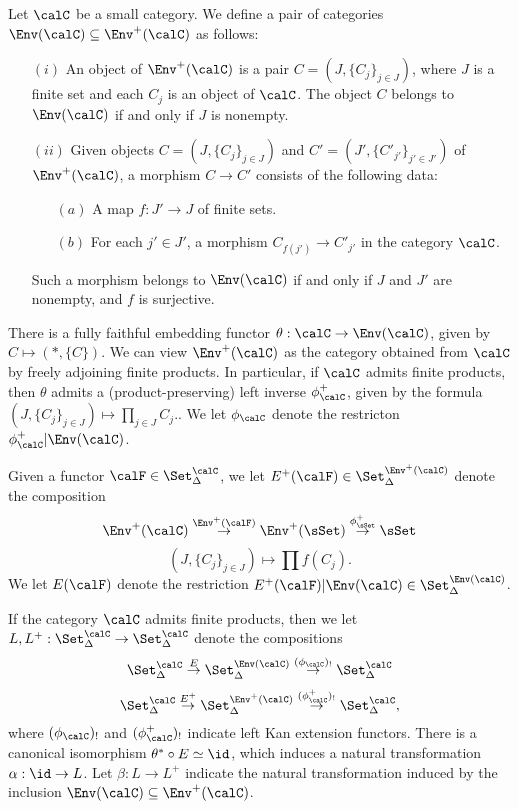 \begin{notation}\label{bignote}
Let $\calC$ be a small category. We define a pair of categories $\Env(\calC) \subseteq \Env^{+}(\calC)$ as follows:

\begin{itemize}
\item[$(i)$] An object of $\Env^{+}(\calC)$ is a pair $C = (J, \{ C_j\}_{j \in J} )$, where $J$ is a finite set and each $C_j$ is an object of $\calC$. The object $C$ belongs to $\Env(\calC)$ if and only if $J$ is nonempty. 

\item[$(ii)$] Given objects $C = (J, \{ C_j \}_{j \in J})$ and $C' = (J', \{ C'_{j'} \}_{j' \in J' } )$
of $\Env^{+}(\calC)$, a morphism $C \rightarrow C'$ consists of the following data:
\begin{itemize}
\item[$(a)$] A map $f: J' \rightarrow J$ of finite sets.
\item[$(b)$] For each $j' \in J'$, a morphism $C_{f(j')} \rightarrow C'_{j'}$ in the category $\calC$.
\end{itemize}
Such a morphism belongs to $\Env(\calC)$ if and only if $J$ and $J'$ are nonempty, and $f$ is surjective.
\end{itemize}

There is a fully faithful embedding functor $\theta: \calC \rightarrow \Env(\calC)$, given by
$C \mapsto ( \ast, \{ C \} )$. We can view $\Env^{+}(\calC)$ as the category
obtained from $\calC$ by freely adjoining finite products. In particular, if $\calC$ admits finite products, then $\theta$ admits a (product-preserving) left inverse $\phi^{+}_{\calC}$, given by the formula $( J, \{ C_j \}_{j \in J} ) \mapsto \prod_{j \in J} C_j.$. We let $\phi_{\calC}$ denote the restricton $\phi^{+}_{\calC} | \Env(\calC)$. 

Given a functor $\calF \in \Set_{\Delta}^{\calC}$, we let $E^{+}(\calF) \in
\Set_{\Delta}^{\Env^{+}(\calC)}$ denote the composition
$$ \Env^{+}(\calC) \stackrel{ \Env^{+}(\calF) }{\rightarrow} \Env^{+}(\sSet) \stackrel{ \phi^{+}_{\sSet}}{\rightarrow} \sSet$$
$$ (J, \{ C_j\}_{j \in J} ) \mapsto \prod f(C_j).$$
We let $E(\calF)$ denote the restriction $E^{+}(\calF) | \Env(\calC) \in \Set_{\Delta}^{\Env(\calC)}$.

If the category $\calC$ admits finite products, then we let
$L, L^{+}: \Set_{\Delta}^{\calC} \rightarrow \Set_{\Delta}^{\calC}$ denote the compositions 
$$ \Set_{\Delta}^{\calC} \stackrel{E}{\rightarrow} \Set_{\Delta}^{\Env(\calC)}
\stackrel{ (\phi_{\calC})_{!} }{\rightarrow} \Set_{\Delta}^{\calC}$$
$$ \Set_{\Delta}^{\calC} \stackrel{E^{+}}{\rightarrow} \Set_{\Delta}^{\Env^{+}(\calC)}
\stackrel{ (\phi_{\calC}^{+})_{!} }{\rightarrow} \Set_{\Delta}^{\calC},$$
where $(\phi_{\calC})_{!}$ and $(\phi_{\calC}^{+})_{!}$ indicate left Kan extension functors. 
There is a canonical isomorphism $\theta^{\ast} \circ E \simeq \id$, which induces a natural transformation $\alpha: \id \rightarrow L$. Let $\beta: L \rightarrow L^{+}$ indicate the natural transformation induced by the inclusion $\Env(\calC) \subseteq \Env^{+}(\calC)$.
\end{notation}

